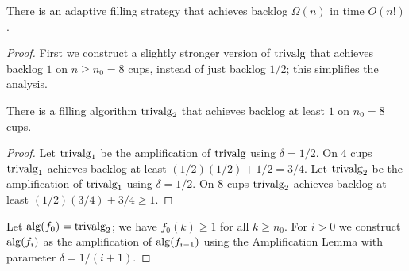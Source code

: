 \begin{theorem}
  \label{thm:factorialTimeAlg}
  There is an adaptive filling strategy that
  achieves backlog $\Omega(n)$ in time $O(n!)$.
\end{theorem}
\begin{proof}
  First we construct a slightly stronger version of $\operatorname{\text{\textup{trivalg}}}$
  that achieves backlog $1$ on $n \ge n_0=8$ cups, instead of
  just backlog $1/2$; this simplifies the analysis.
  \begin{clm}
    There is a filling algorithm $\operatorname{\text{\textup{trivalg}}}_2$ that achieves
    backlog at least $1$ on $n_0 = 8$ cups.
  \end{clm}
  \begin{proof}
    Let $\operatorname{\text{\textup{trivalg}}}_1$ be the amplification of $\operatorname{\text{\textup{trivalg}}}$ using
    $\delta = 1/2$. On $4$ cups $\operatorname{\text{\textup{trivalg}}}_1$ achieves backlog at
    least $(1/2)(1/2)+1/2 = 3/4$.
    Let $\operatorname{\text{\textup{trivalg}}}_2$ be the amplification of $\operatorname{\text{\textup{trivalg}}}_1$ using
    $\delta = 1/2$. On $8$ cups $\operatorname{\text{\textup{trivalg}}}_2$ achieves backlog at
    least $(1/2)(3/4) + 3/4 \ge 1$.
  \end{proof}

  Let $\operatorname{\text{\textup{alg}}}(f_0)=\operatorname{\text{\textup{trivalg}}}_2$; we have $f_0(k) \ge 1$ for all $k
  \ge n_0$. For $i > 0$ we construct $\operatorname{\text{\textup{alg}}}(f_{i})$ as the
  amplification of $\operatorname{\text{\textup{alg}}}(f_{i-1})$ using the Amplification Lemma
  with parameter $\delta = 1/(i+1)$. 


\end{proof}
